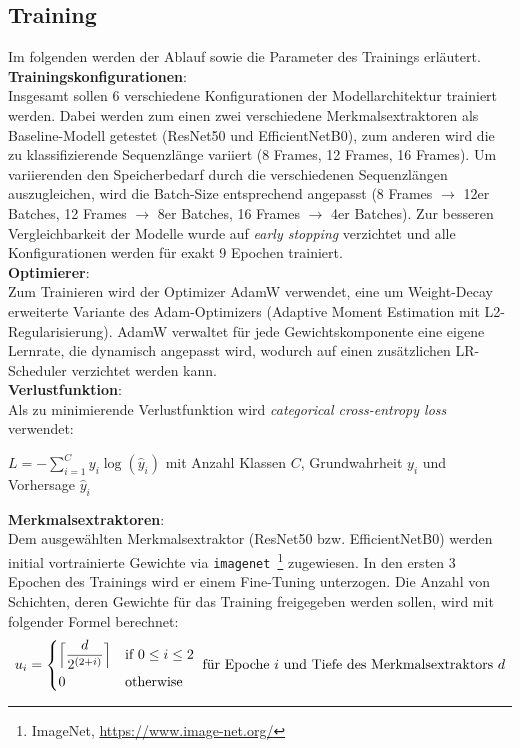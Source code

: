 \documentclass{article}
\newcommand{\resnet}{ResNet50\xspace}
\newcommand{\effnet}{EfficientNetB0\xspace}
\begin{document}
\subsection{Training}\label{ssec:training}
Im folgenden werden der Ablauf sowie die Parameter des Trainings erläutert.
\\[0.5em]
\textbf{Trainingskonfigurationen}:\\
Insgesamt sollen 6 verschiedene Konfigurationen der Modellarchitektur trainiert werden.
Dabei werden zum einen zwei verschiedene Merkmalsextraktoren als Baseline-Modell getestet (\resnet und \effnet), zum anderen wird die zu klassifizierende Sequenzlänge variiert (8 Frames, 12 Frames, 16 Frames).
Um variierenden den Speicherbedarf durch die verschiedenen Sequenzlängen auszugleichen, wird die Batch-Size entsprechend angepasst (8 Frames $\rightarrow$ 12er Batches, 12 Frames $\rightarrow$ 8er Batches, 16 Frames $\rightarrow$ 4er Batches).
Zur besseren Vergleichbarkeit der Modelle wurde auf \textit{early stopping} verzichtet und alle Konfigurationen werden für exakt 9 Epochen trainiert.
\\[0.5em]
\textbf{Optimierer}:\\
Zum Trainieren wird der Optimizer AdamW verwendet, eine um Weight-Decay erweiterte Variante des Adam-Optimizers (Adaptive Moment Estimation mit L2-Regularisierung).
AdamW verwaltet für jede Gewichtskomponente eine eigene Lernrate, die dynamisch angepasst wird, wodurch auf einen zusätzlichen LR-Scheduler verzichtet werden kann.
\\[0.5em]
\textbf{Verlustfunktion}:\\
Als zu minimierende Verlustfunktion wird \textit{categorical cross-entropy loss} verwendet:
\begin{center}
    $\displaystyle L=-\sum_{i=1}^Cy_i\log(\hat y_i)$ mit Anzahl Klassen $C$, Grundwahrheit $y_i$ und Vorhersage $\hat y_i$
\end{center}
\textbf{Merkmalsextraktoren}:\\
Dem ausgewählten Merkmalsextraktor (\resnet bzw. \effnet) werden initial vortrainierte Gewichte via \texttt{imagenet}~\footnote{ImageNet, \url{https://www.image-net.org/}} zugewiesen.
In den ersten 3 Epochen des Trainings wird er einem Fine-Tuning unterzogen.
Die Anzahl von Schichten, deren Gewichte für das Training freigegeben werden sollen, wird mit folgender Formel berechnet:
\[
    u_i= 
    \begin{dcases}
        \Big\lceil\frac{d}{2^{(2+i)}}\Big\rceil & \text{if } 0\le i \le 2 \\
        0 & \text{otherwise}
    \end{dcases}
    \text{ für Epoche $i$ und Tiefe des Merkmalsextraktors $d$}
\]
\end{document}
